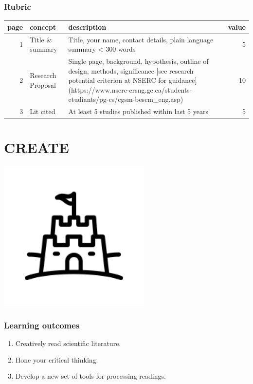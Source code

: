 \documentclass[
]{book}
\providecommand{\tightlist}{%
  \setlength{\itemsep}{0pt}\setlength{\parskip}{0pt}}
\begin{document}
\hypertarget{rubric-1}{%
\subsection*{Rubric}\label{rubric-1}}

\begin{tabular}{r|l|l|r}
\hline
page & concept & description & value\\
\hline
1 & Title \& summary & Title, your name, contact details, plain language summary < 300 words & 5\\
\hline
2 & Research Proposal & Single page, background, hypothesis, outline of design, methods, significance [see research potential criterion at NSERC for guidance](https://www.nserc-crsng.gc.ca/students-etudiants/pg-cs/cgsm-bescm\_eng.asp) & 10\\
\hline
3 & Lit cited & At least 5 studies published within last 5 years & 5\\
\hline
\end{tabular}

\hypertarget{create}{%
\chapter{CREATE}\label{create}}

\includegraphics[width=3in,height=\textheight]{./castle.png}

\hypertarget{learning-outcomes-3}{%
\subsection*{Learning outcomes}\label{learning-outcomes-3}}

\begin{enumerate}
\def\labelenumi{\arabic{enumi}.}
\tightlist
\item
  Creatively read scientific literature.\\
\item
  Hone your critical thinking.\\
\item
  Develop a new set of tools for processing readings.
\end{enumerate}
\end{document}
